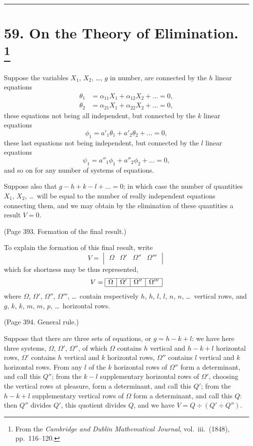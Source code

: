 \documentclass[11pt,a4paper]{article}
\theoremstyle{plain}
\theoremstyle{definition}
\begin{document}
\bigskip
\hrule
\bigskip

\newpage
\section[On the Theory of Elimination]{%
59. On the Theory of Elimination.%
\footnote{From the \textit{Cambridge and Dublin Mathematical Journal}, vol.~iii.\ (1848), pp.~116--120.}}

Suppose the variables $X_1$, $X_2$, \ldots, $g$ in number, are connected by the $h$ linear
equations
\begin{align*}
\theta_1 &= \alpha_{11}X_1 + \alpha_{12}X_2 + \ldots = 0, \\
\theta_2 &= \alpha_{21}X_1 + \alpha_{22}X_2 + \ldots = 0,
\end{align*}
these equations not being all independent, but connected by the $k$ linear equations
\[
\phi_1 = a'_1\theta_1 + a'_2\theta_2 + \ldots = 0,
\]
these last equations not being independent, but connected by the $l$ linear equations
\[
\psi_1 = a''_1\phi_1 + a''_2\phi_2 + \ldots = 0,
\]
and so on for any number of systems of equations.

Suppose also that $g - h + k - l + \ldots = 0$; in which case the number of quantities
$X_1$, $X_2$, \ldots\ will be equal to the number of really independent equations connecting
them, and we may obtain by the elimination of these quantities a result $V = 0$.

(Page 393. Formation of the final result.)

To explain the formation of this final result, write
\[
V =
\begin{vmatrix}
\Omega & \Omega' & \Omega'' & \Omega''' \\
\end{vmatrix}
\]
which for shortness may be thus represented,
\[
V =
\begin{array}{|c|c|c|c|}
\hline
\Omega & \Omega' & \Omega'' & \Omega''' \\
\hline
\end{array}
\]
where $\Omega$, $\Omega'$, $\Omega''$, $\Omega'''$, \ldots\ contain respectively $h$, $h$, $l$, $l$, $n$, $n$, \ldots\ vertical rows, and
$g$, $k$, $k$, $m$, $m$, $p$, \ldots\ horizontal rows.

(Page 394. General rule.)

Suppose that there are three sets of equations, or $g = h - k + l$: we have here three
systems, $\Omega$, $\Omega'$, $\Omega''$, of which $\Omega$ contains $h$ vertical and $h-k+l$ horizontal rows, $\Omega'$
contains $h$ vertical and $k$ horizontal rows, $\Omega''$ contains $l$ vertical and $k$ horizontal rows.
From any $l$ of the $k$ horizontal rows of $\Omega''$ form a determinant, and call this $Q''$; from
the $k-l$ supplementary horizontal rows of $\Omega'$, choosing the vertical rows at pleasure,
form a determinant, and call this $Q'$; from the $h-k+l$ supplementary vertical rows
of $\Omega$ form a determinant, and call this $Q$: then $Q''$ divides $Q'$, this quotient divides
$Q$, and we have $V = Q \div (Q' \div Q'')$.
\end{document}
